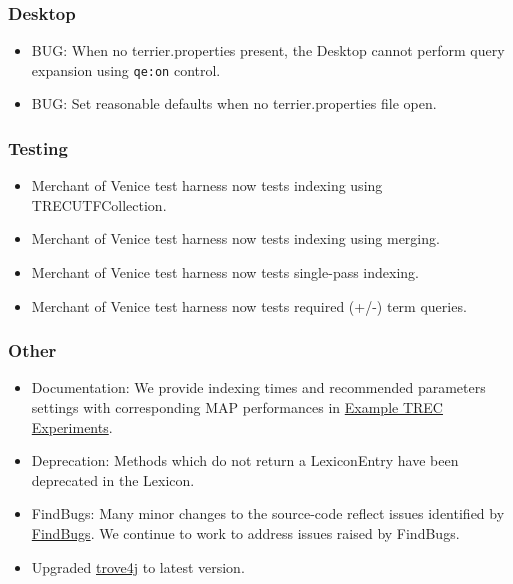 \subsubsection{Desktop}\label{desktop-3}

\begin{itemize}
\tightlist
\item
  BUG: When no terrier.properties present, the Desktop cannot perform
  query expansion using \texttt{qe:on} control.
\item
  BUG: Set reasonable defaults when no terrier.properties file open.
\end{itemize}

\subsubsection{Testing}\label{testing-4}

\begin{itemize}
\tightlist
\item
  Merchant of Venice test harness now tests indexing using
  TRECUTFCollection.
\item
  Merchant of Venice test harness now tests indexing using merging.
\item
  Merchant of Venice test harness now tests single-pass indexing.
\item
  Merchant of Venice test harness now tests required (+/-) term queries.
\end{itemize}

\subsubsection{Other}\label{other-7}

\begin{itemize}
\tightlist
\item
  Documentation: We provide indexing times and recommended parameters
  settings with corresponding MAP performances in
  \href{trec_examples.html}{Example TREC Experiments}.
\item
  Deprecation: Methods which do not return a LexiconEntry have been
  deprecated in the Lexicon.
\item
  FindBugs: Many minor changes to the source-code reflect issues
  identified by \href{http://findbugs.sourceforge.net/}{FindBugs}. We
  continue to work to address issues raised by FindBugs.
\item
  Upgraded \href{trove4j.sourceforge.net/}{trove4j} to latest version.
\end{itemize}

